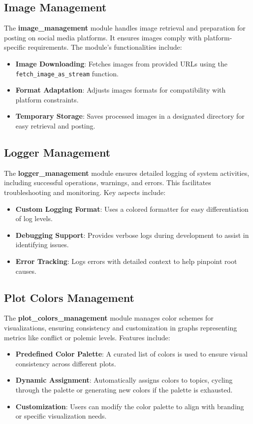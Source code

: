 \subsection{Image Management}
\label{subsec:image_management}
The \textbf{image\_management} module handles image retrieval and preparation for posting on social media platforms. It ensures images comply with platform-specific requirements. The module’s functionalities include:
\begin{itemize}
    \item \textbf{Image Downloading}: Fetches images from provided URLs using the \texttt{fetch\_image\_as\_stream} function.
    \item \textbf{Format Adaptation}: Adjusts images formats for compatibility with platform constraints.
    \item \textbf{Temporary Storage}: Saves processed images in a designated directory for easy retrieval and posting.
\end{itemize}

\subsection{Logger Management}
\label{subsec:logger_management}
The \textbf{logger\_management} module ensures detailed logging of system activities, including successful operations, warnings, and errors. This facilitates troubleshooting and monitoring. Key aspects include:
\begin{itemize}
    \item \textbf{Custom Logging Format}: Uses a colored formatter for easy differentiation of log levels.
    \item \textbf{Debugging Support}: Provides verbose logs during development to assist in identifying issues.
    \item \textbf{Error Tracking}: Logs errors with detailed context to help pinpoint root causes.
\end{itemize}

\subsection{Plot Colors Management}
\label{subsec:plot_colors_management}
The \textbf{plot\_colors\_management} module manages color schemes for visualizations, ensuring consistency and customization in graphs representing metrics like conflict or polemic levels. Features include:
\begin{itemize}
    \item \textbf{Predefined Color Palette}: A curated list of colors is used to ensure visual consistency across different plots.
    \item \textbf{Dynamic Assignment}: Automatically assigns colors to topics, cycling through the palette or generating new colors if the palette is exhausted.
    \item \textbf{Customization}: Users can modify the color palette to align with branding or specific visualization needs.
\end{itemize}

